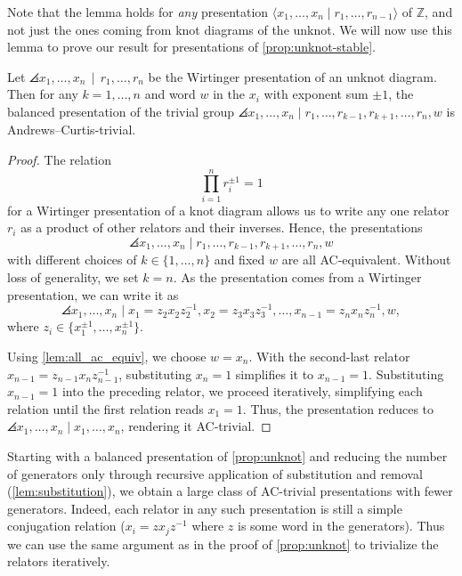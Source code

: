 Note that the lemma holds for \emph{any} presentation $\langle x_1,\ldots, x_n \mid r_1,\ldots,r_{n-1}\rangle$ of $\mathbb{Z}$, and not just the ones coming from knot diagrams of the unknot. We will now use this lemma to prove our result for presentations of \autoref{prop:unknot-stable}.

\begin{theorem} \label{prop:unknot}
    Let $\angles{ x_1,\ldots, x_n\, \mid \, r_1, \ldots, r_n }$ be the Wirtinger presentation of an unknot diagram. Then for any $k=1,\ldots,n$ and word $w$ in the $x_i$ with exponent sum $\pm 1$, the balanced presentation of the trivial group $\angles{ x_1,\ldots, x_n \mid r_1,\ldots, r_{k-1}, r_{k+1},\ldots, r_n, w}$ is Andrews--Curtis-trivial.
\end{theorem}

\begin{proof}
The relation  $$\prod\limits_{i=1}^nr_i^{\pm1}=1$$ for a Wirtinger presentation of a knot diagram allows us to write any one relator $r_i$ as a product of other relators and their inverses. Hence, the presentations 
$$\angles{x_1, \ldots, x_n \mid r_1, \ldots, r_{k-1}, r_{k+1}, \ldots, r_n, w}$$ with different choices of $k \in \{1, \ldots, n\}$ and fixed $w$ are all AC-equivalent. Without loss of generality, we set $k=n$. As the presentation comes from a Wirtinger presentation, we can write it as 
\[
\angles{ x_1,\ldots,x_n \mid x_1=z_2x_2z_2^{-1}, x_2=z_3x_3z_3^{-1},\ldots, x_{n-1}=z_{n}x_nz_{n}^{-1}, w },
\]
where $z_i\in \{x_1^{\pm 1},\ldots, x_n^{\pm 1}\}$. 

Using \autoref{lem:all_ac_equiv}, we choose $w = x_n$. 
With the second-last relator \( x_{n-1} = z_{n-1} x_n z_{n-1}^{-1} \), substituting \( x_n = 1 \) simplifies it to \( x_{n-1} = 1 \). Substituting \( x_{n-1} = 1 \) into the preceding relator, we proceed iteratively, simplifying each relation until the first relation reads \( x_1 = 1 \). 
Thus, the presentation reduces to  $\angles{x_1, \ldots, x_n \mid x_1, \ldots, x_n}$,
rendering it AC-trivial. 
\end{proof}
\begin{remark}
    Starting with a balanced presentation of \autoref{prop:unknot} and reducing the number of generators only through recursive application of substitution and removal (\autoref{lem:substitution}), we obtain a large class of AC-trivial presentations with fewer generators. Indeed, each relator in any such presentation is still a simple conjugation relation ($x_i=zx_jz^{-1}$ where $z$ is some word in the generators). Thus we can use the same argument as in the proof of \autoref{prop:unknot} to trivialize the relators iteratively. 
\end{remark}

